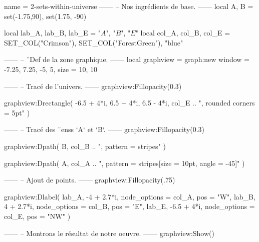 \documentclass{standalone}
\begin{document}
\begin{luadraw}{name = 2-sets-within-universe}
------
-- Nos ingrédients de base.
------
local A, B = set(-1.75,90), set(1.75, -90)

local lab_A, lab_B, lab_E = "$A$", "$B$", "$E$"
local col_A, col_B, col_E = SET_COL("Crimson"), SET_COL("ForestGreen"), "blue"

------
-- ¨Def de la zone graphique.
------
local graphview = graph:new{
  window = {-7.25, 7.25, -5, 5},
  size   = {10, 10}
}

------
-- Tracé de l'univers.
------
graphview:Fillopacity(0.3)

graphview:Drectangle(
  -6.5 + 4*i, 6.5 + 4*i, 6.5 - 4*i,
  col_E .. ", rounded corners = 5pt"
)

------
-- Tracé des ¨enss `A` et `B`.
------
graphview:Fillopacity(0.3)

graphview:Dpath(
  B,
  col_B .. ", pattern = stripes"
)

graphview:Dpath(
  A,
  col_A .. ", pattern = {stripes[size = 10pt, angle = -45]}"
)

------
-- Ajout de points.
------
graphview:Fillopacity(.75)

graphview:Dlabel(
  lab_A, -4 + 2.7*i, {node_options = col_A, pos = "W"},
  lab_B,  4 + 2.7*i, {node_options = col_B, pos = "E"},
  lab_E, -6.5 + 4*i, {node_options = col_E, pos = "NW"}
)

------
-- Montrons le résultat de notre oeuvre.
------
graphview:Show()
\end{luadraw}
\end{document}
